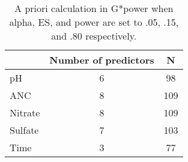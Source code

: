 \begin{table}[htbp]
		\caption{A priori calculation in G*power when alpha, ES, and power are set to .05, .15, and .80 respectively.}
		\begin{center}
		\begin{tabular}{lcc}
		\hline\noalign{\smallskip}
		 & \multicolumn{1}{l}{Number of predictors} & N \\  \hline\noalign{\smallskip}
		pH & 6 & 98 \\ 
		ANC & 8 & 109 \\ 
		Nitrate & 8 & 109 \\ 
		Sulfate & 7 & 103 \\ 
		Time & 3 & 77 \\  \hline
		\end{tabular}
		\end{center}
		\label{APN}
		\end{table}